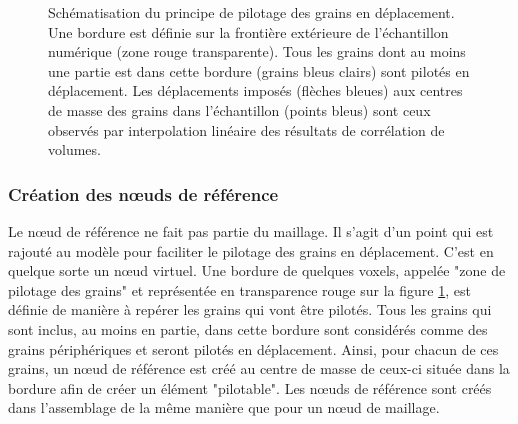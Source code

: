 \begin{figure}
			\caption{\label{fig05:conditions_limites}Schématisation du principe de pilotage des grains en déplacement. Une bordure est définie sur la frontière extérieure de l'échantillon numérique (zone rouge transparente). Tous les grains dont au moins une partie est dans cette bordure (grains bleus clairs) sont pilotés en déplacement. Les déplacements imposés (flèches bleues) aux centres de masse des grains dans l'échantillon (points bleus) sont ceux observés par interpolation linéaire des résultats de corrélation de volumes.}
		\end{figure}
		\subsubsection{Création des n\oe{}uds de référence}
			Le n\oe{}ud de référence ne fait pas partie du maillage. Il s'agit d'un point qui est rajouté au modèle pour faciliter le pilotage des grains en déplacement. C'est en quelque sorte un n\oe{}ud virtuel. Une bordure de quelques voxels, appelée "zone de pilotage des grains" et représentée en transparence rouge sur la figure \ref{fig05:conditions_limites}, est définie de manière à repérer les grains qui vont être pilotés. Tous les grains qui sont inclus, au moins en partie, dans cette bordure sont considérés comme des grains périphériques et seront pilotés en déplacement. Ainsi, pour chacun de ces grains, un n\oe{}ud de référence est créé au centre de masse de ceux-ci située dans la bordure afin de créer un élément "pilotable". Les n\oe{}uds de référence sont créés dans l'assemblage de la même manière que pour un n\oe{}ud de maillage.
